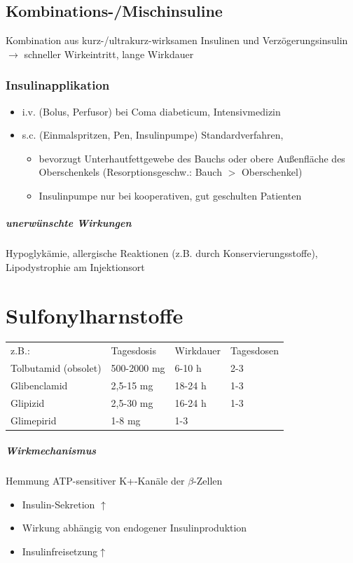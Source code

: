 \documentclass[10pt,a4paper]{report}
\begin{document}
\subsection{Kombinations-/Mischinsuline} %
\label{sub:kombinations_mischinsuline}
Kombination aus kurz-/ultrakurz-wirksamen Insulinen und Verzögerungsinsulin $\rightarrow$ schneller Wirkeintritt, lange Wirkdauer
\subsubsection{Insulinapplikation} %
\label{ssub:insulinapplikation}
\begin{itemize}
	\item i.v.	(Bolus, Perfusor) bei Coma diabeticum, Intensivmedizin
	\item s.c.	(Einmalspritzen, Pen, Insulinpumpe) Standardverfahren,
	\begin{itemize}
		\item bevorzugt Unterhautfettgewebe des Bauchs oder obere Außenfläche des Oberschenkels (Resorptionsgeschw.: Bauch $>$ Oberschenkel)
		\item Insulinpumpe nur bei kooperativen, gut geschulten Patienten
	\end{itemize}
\end{itemize}
\subparagraph{unerwünschte Wirkungen} %
\label{subp:unerw_nschte_wirkungen}
Hypoglykämie, allergische Reaktionen (z.B. durch Konservierungsstoffe), Lipodystrophie am Injektionsort
\section{Sulfonylharnstoffe} %
\label{sec:sulfonylharnstoffe}
\begin{tabularx}{\textwidth}{XXXX}
z.B.:&Tagesdosis&Wirkdauer&Tagesdosen\\
Tolbutamid (obsolet)&500-2000 mg&6-10 h&2-3\\
Glibenclamid&2,5-15 mg&18-24 h&1-3\\
Glipizid&2,5-30 mg&16-24 h&1-3\\
Glimepirid&1-8 mg&1-3\\
\end{tabularx}
\subparagraph{Wirkmechanismus} %
\label{subp:wirkmechanismus}
Hemmung ATP-sensitiver K+-Kanäle der $\beta$-Zellen
\begin{itemize}
	\item Insulin-Sekretion $\uparrow$
	\item Wirkung abhängig von endogener Insulinproduktion
	\item Insulinfreisetzung$\uparrow$
\end{itemize}
\end{document}

